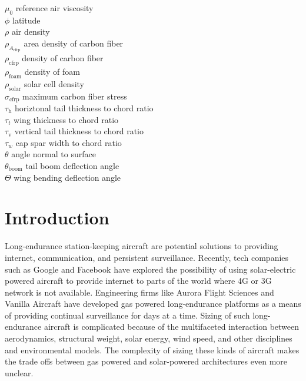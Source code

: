\begin{multicols}{2}
\begin{tabbing}
$\mu_0$ \> reference air viscosity \\ %
$\phi$ \> latitude \\
$\rho$ \> air density \\ %
$\rho_{A_{\text{cfrp}}}$ \> area density of carbon fiber \\ %
$\rho_{\text{cfrp}}$ \> density of carbon fiber \\ %
$\rho_{\text{foam}}$ \> density of foam \\ %
$\rho_{\text{solar}}$ \> solar cell density \\ %
$\sigma_{\text{cfrp}}$ \> maximum carbon fiber stress \\ %
$\tau_{\text{h}}$ \> horiztonal tail thickness to chord ratio \\
$\tau_t$ \> wing thickness to chord ratio \\
$\tau_{\text{v}}$ \> vertical tail thickness to chord ratio \\
$\tau_w$ \> cap spar width to chord ratio \\
$\theta$ \> angle normal to surface \\
$\theta_{\text{boom}}$ \> tail boom deflection angle \\
$\Theta$ \> wing bending deflection angle 
 \end{tabbing}

\end{multicols}

\section{Introduction}

Long-endurance station-keeping aircraft are potential solutions to providing internet, communication, and persistent surveillance. 
Recently, tech companies such as Google\cite{googletitan} and Facebook\cite{aquila} have explored the possibility of using solar-electric powered aircraft to provide internet to parts of the world where 4G or 3G network is not available. 
Engineering firms like Aurora Flight Sciences\cite{orion} and Vanilla Aircraft\cite{vanilla} have developed gas powered long-endurance platforms as a means of providing continual surveillance for days at a time.  
Sizing of such long-endurance aircraft is complicated because of the multifaceted interaction between aerodynamics, structural weight, solar energy, wind speed, and other disciplines and environmental models.
The complexity of sizing these kinds of aircraft makes the trade offs between gas powered and solar-powered architectures even more unclear. 

